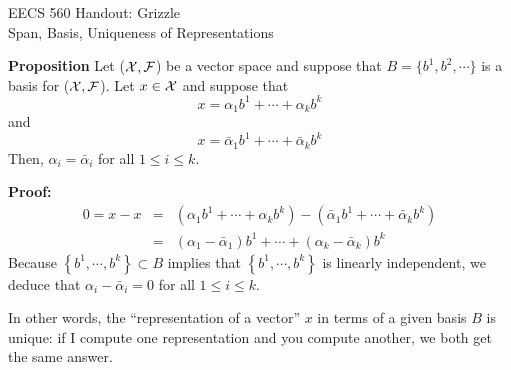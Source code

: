 \documentclass[11pt,twoside]{nsf_jwg} %
\begin{document}


\baselineskip=48pt  %


\setlength{\parskip}{.3in}
\setlength{\itemsep}{.3in}

\pagestyle{plain}

{\Large \bf
\begin{center}
EECS 560 Handout: Grizzle \\
Span, Basis, Uniqueness of Representations
\end{center}
}



\Large





\textbf{Proposition} Let (${\cal X}, {\cal F}$) be a vector space and suppose that $B = \{ b^1, b^2, \cdots\}$ is a basis for (${\cal X}, {\cal F}$). Let $x \in {\cal X}$ and suppose that\\
$$ x = \alpha_1 b^1 + \cdots + \alpha_k b^k$$
and
$$ x = \bar{\alpha}_1 b^1 + \cdots +\bar{\alpha}_k b^k$$
Then, $\alpha_ i = \bar{\alpha}_i$ for all $1 \le i \le k$.

\vspace*{.3in}


\textbf{Proof:}
\begin{eqnarray*}
0 = x - x & = & \left( \alpha_1 b^1 + \cdots + \alpha_k b^k\right) - \left(  \bar{\alpha}_1 b^1 + \cdots +\bar{\alpha}_k b^k \right) \\
&=& (\alpha_1 - \bar{\alpha}_1) b^1 + \cdots + (\alpha_k - \bar{\alpha}_k) b^k
\end{eqnarray*}
Because $\left\{ b^1, \cdots, b^k \right\} \subset B$ implies that $\left\{ b^1, \cdots, b^k \right\}$ is linearly independent, we deduce that $\alpha_i - \bar{\alpha}_i=0$ for all $1 \le i \le k$.

\vspace*{.2in}
In other words, the ``representation of a vector'' $x$ in terms of a given basis $B$ is unique: if I compute one representation and you compute another, we both get the same answer.
\end{document}
